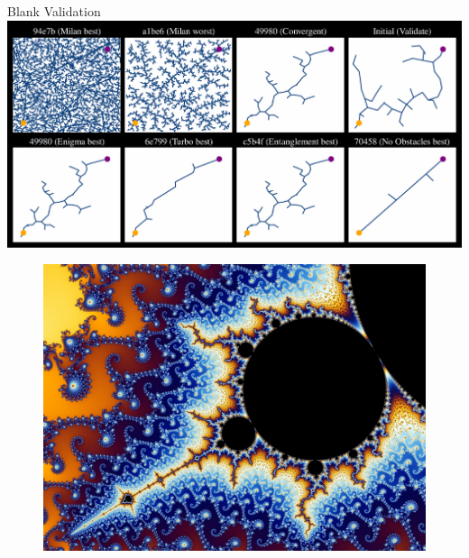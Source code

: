 \documentclass[aspectratio=169]{beamer}
\begin{document}
\begin{frame}{Blank Validation}
    \includegraphics[width=1.0\linewidth, keepaspectratio]{figures/blank_val.pdf}
\end{frame}

% 

\begin{frame}[plain]{}
  \begin{figure}
  \vspace*{-4em}
  \hspace*{-4em}
  \includegraphics[width=1.2\linewidth,keepaspectratio]{figures/mandelbrot_2.jpg}
  \end{figure}
\end{frame}
\end{document}
